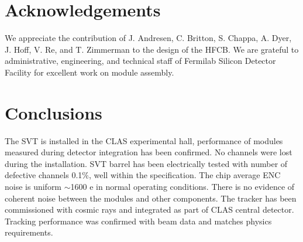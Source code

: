 \section{Acknowledgements}

We appreciate the contribution of J.  Andresen, C. Britton, S. Chappa, A. Dyer, J. Hoff, V. Re, and T. Zimmerman to the design of the HFCB. We are grateful to administrative, engineering, and technical staff of Fermilab Silicon Detector Facility for excellent work on module assembly.

\section{Conclusions}

The SVT is installed in the CLAS experimental hall, performance of modules measured during detector integration has been confirmed. No channels were lost during the installation. SVT barrel has been electrically  tested with number of defective channels 0.1$\%$, well within the specification. The chip average ENC noise is uniform $\sim$1600 e in normal operating conditions. There is no evidence of coherent noise between the modules and other components. The tracker has been commissioned with cosmic rays and integrated as part of  CLAS central detector. Tracking performance was confirmed with beam data and matches physics requirements. 



